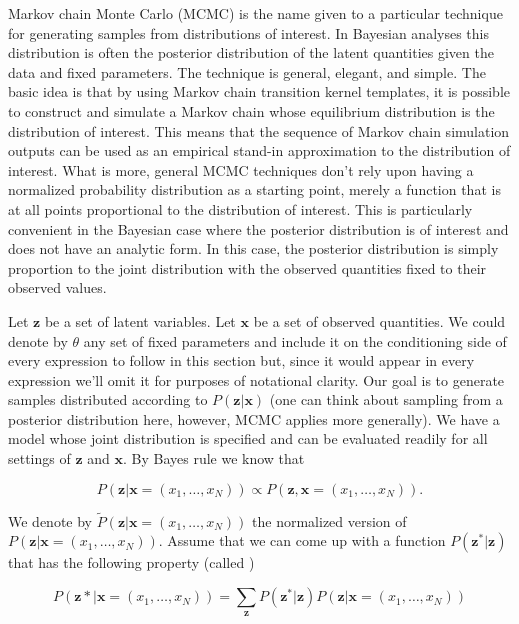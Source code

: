 Markov chain Monte Carlo (MCMC) is the name given to a particular technique for generating samples from distributions of interest.  In Bayesian analyses this distribution is often the posterior distribution of the latent quantities given the data and fixed parameters.  The technique is general, elegant, and simple.  The basic idea is that by using Markov chain transition kernel templates, it is possible to construct and simulate a Markov chain whose equilibrium distribution is the distribution of interest.   This means that  the sequence of Markov chain simulation outputs can be used as an empirical stand-in approximation to the distribution of interest.  What is more, general MCMC techniques don't rely upon having a normalized probability distribution as a starting point, merely a function that is at all points proportional to the distribution of interest.   This is particularly convenient in the Bayesian case where the posterior distribution is of interest and does not have an analytic form.  In this case, the posterior distribution is simply proportion to the joint distribution with the observed quantities fixed to their observed values.

Let $\mathbf{z}$ be a set of latent variables.  Let $\mathbf{x}$ be a set of observed quantities.  We could denote by $\theta$ any set of fixed parameters and include it on the conditioning side of every expression to follow in this section but, since it would appear in every expression we'll omit it for purposes of notational clarity.  Our goal is to generate samples distributed according to $P(\mathbf{z} | \mathbf{x})$ (one can think about sampling from a posterior distribution here, however, MCMC applies more generally).  We have a model whose joint distribution is specified and can be evaluated readily for all settings of $\mathbf{z}$ and $\mathbf{x}$.  By Bayes rule we know that

\[P(\mathbf{z} | \mathbf{x} = (x_1, \ldots, x_N) ) \propto P(\mathbf{z}, \mathbf{x}= (x_1, \ldots, x_N)).\]

We denote by $\tilde{P}(\mathbf{z} | \mathbf{x} = (x_1, \ldots, x_N) )$ the normalized version of $P(\mathbf{z} | \mathbf{x} = (x_1, \ldots, x_N) )$.  Assume that we can come up with a function $P(\mathbf{z}^* | \mathbf{z})$ that has the following property (called )

\[P(\mathbf{z*} | \mathbf{x} = (x_1, \ldots, x_N) ) = \sum_ \mathbf{z} P(\mathbf{z}^* | \mathbf{z}) P(\mathbf{z} | \mathbf{x} = (x_1, \ldots, x_N) )\]
